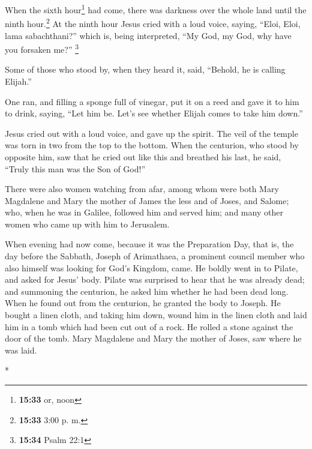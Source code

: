 \begin{paracol}{2}
\begin{otherlanguage}{english}
 When the sixth hour\footnote{\textbf{15:33} or, noon}
had come, there was darkness over the whole land until the ninth
hour.\footnote{\textbf{15:33} 3:00 p. m.}  At the ninth
hour Jesus cried with a loud voice, saying, ``Eloi, Eloi, lama
sabachthani?'' which is, being interpreted, ``My God, my God, why have
you forsaken me?'' \footnote{\textbf{15:34} Psalm 22:1}

 Some of those who stood by, when they heard it, said,
``Behold, he is calling Elijah.''

 One ran, and filling a sponge full of vinegar, put it on
a reed and gave it to him to drink, saying, ``Let him be. Let's see
whether Elijah comes to take him down.''

 Jesus cried out with a loud voice, and gave up the
spirit.  The veil of the temple was torn in two from the
top to the bottom.  When the centurion, who stood by
opposite him, saw that he cried out like this and breathed his last, he
said, ``Truly this man was the Son of God!''

 There were also women watching from afar, among whom
were both Mary Magdalene and Mary the mother of James the less and of
Joses, and Salome;  who, when he was in Galilee, followed
him and served him; and many other women who came up with him to
Jerusalem.

 When evening had now come, because it was the
Preparation Day, that is, the day before the Sabbath, 
Joseph of Arimathaea, a prominent council member who also himself was
looking for God's Kingdom, came. He boldly went in to Pilate, and asked
for Jesus' body.  Pilate was surprised to hear that he
was already dead; and summoning the centurion, he asked him whether he
had been dead long.  When he found out from the
centurion, he granted the body to Joseph.  He bought a
linen cloth, and taking him down, wound him in the linen cloth and laid
him in a tomb which had been cut out of a rock. He rolled a stone
against the door of the tomb.  Mary Magdalene and Mary
the mother of Joses, saw where he was laid.

\end{otherlanguage}

\switchcolumn[0]*

\hypertarget{descubrimiento-de-la-tumba-vacuxeda-en-la-mauxf1ana-de-pascua-la-revelaciuxf3n-del-uxe1ngel-a-las-mujeres}{%
}
\end{paracol}
